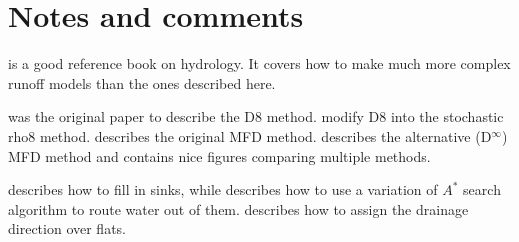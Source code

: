 %
\section{Notes and comments}

\citet{Beven12} is a good reference book on hydrology.
It covers how to make much more complex runoff models than the ones described here.

\citet{OCallaghan84} was the original paper to describe the D8 method.
\citet{Fairfield91} modify D8 into the stochastic rho8 method.
\citet{Quinn91} describes the original MFD method.
\citet{Tarborton97} describes the alternative (D\(^{\infty}\)) MFD method and contains nice figures comparing multiple methods.

\citet{Barnes14a} describes how to fill in sinks, while \citet{Metz11} describes how to use a variation of \(A^{*}\) search algorithm to route water out of them.
\citet{Barnes14} describes how to assign the drainage direction over flats.


